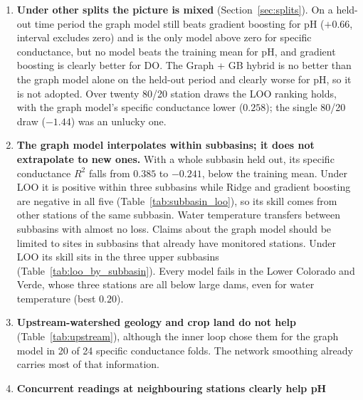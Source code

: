 \documentclass[11pt]{article}
\begin{document}
\begin{enumerate}
{        improve the graph model} (Section~\ref{sec:ideas}), apart from a possible $+0.09$ for
        turbidity with the varying seasonal cycle. REML is clearly worse for specific
        conductance and pH, because it treats the station offsets as noise. Only graph + gradient
        boosting changes a target materially: turbidity $0.104\to0.349$, close to gradient boosting
        ($0.391$), while keeping the graph model's lead for specific conductance and pH. The turbidity
        interval still crosses zero, so this hybrid should be confirmed before it is adopted.
  \item \textbf{Under other splits the picture is mixed} (Section~\ref{sec:splits}). On a held-out
        time period the graph model still beats gradient boosting for pH ($+0.66$, interval excludes
        zero) and is the only model above zero for specific conductance, but no model beats the
        training mean for pH, and gradient boosting is clearly better for DO. The Graph + GB hybrid
        is no better than the graph model alone on the held-out period and clearly worse for pH,
        so it is not adopted. Over twenty 80/20 station draws the LOO ranking holds, with the graph
        model's specific conductance lower ($0.258$); the single 80/20 draw ($-1.44$) was an unlucky
        one.
  \item \textbf{The graph model interpolates within subbasins; it does not extrapolate to new
        ones.} With a whole subbasin held out, its specific conductance $R^2$ falls from $0.385$ to
        $-0.241$, below the training mean. Under LOO it is positive within three subbasins while
        Ridge and gradient boosting are negative in all five (Table~\ref{tab:subbasin_loo}), so its
        skill comes from other stations of the same subbasin. Water temperature transfers between
        subbasins with almost no loss. Claims about the graph model should be limited to sites in
        subbasins that already have monitored stations. Under LOO its skill sits in the three upper
        subbasins (Table~\ref{tab:loo_by_subbasin}). Every model fails in the Lower Colorado and
        Verde, whose three stations are all below large dams, even for water temperature (best
        $0.20$).
  \item \textbf{Upstream-watershed geology and crop land do not help} (Table~\ref{tab:upstream}),
        although the inner loop chose them for the graph model in 20 of 24 specific conductance
        folds. The network smoothing already carries most of that information.
  \item \textbf{Concurrent readings at neighbouring stations clearly help pH}

\end{enumerate}
\end{document}
